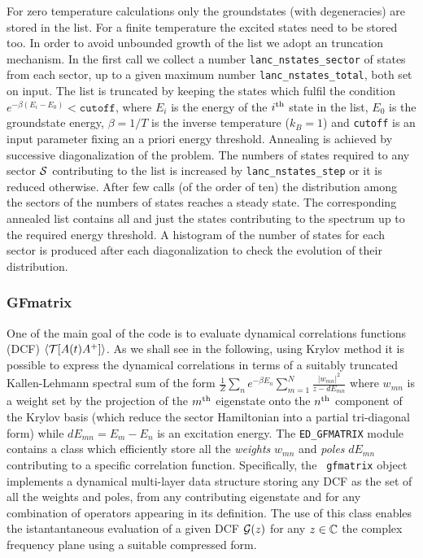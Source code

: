\documentclass[edipack2.tex]{subfiles}
\begin{document}
For zero temperature calculations only the groundstates (with degeneracies) are stored
in the list.
For a finite temperature the excited states need to be stored too.
In order to avoid unbounded growth of the list we adopt an 
truncation mechanism. In the first call we collect a number 
\texttt{lanc\_nstates\_sector} of states from each sector, up to a
given maximum number \texttt{lanc\_nstates\_total}, both set on input.  
The list is truncated by keeping the states which
fulfil the condition $e^{-\beta(E_i-E_0)} < \mathtt{cutoff}$, where
$E_i$ is the energy of the $i^{\rm th}$ state in the list, $E_0$ is the
groundstate energy,  $\beta=1/T$ is the inverse temperature ($k_B=1$) and \texttt{cutoff}
is an input parameter fixing an a priori energy threshold.
%  
Annealing is achieved by successive diagonalization of the problem.
The numbers of states required to any sector ${\cal S}$ contributing to the list is increased by
\texttt{lanc\_nstates\_step} or it is reduced otherwise. After few calls
(of the order of ten) the distribution among the sectors of the
numbers of states reaches a steady state.
The corresponding annealed list contains all and just the states
contributing to the spectrum up to the required energy threshold.
A histogram of the number of states for each sector is produced after
each diagonalization to check the evolution of their distribution.



\subsubsection{GFmatrix}
One of the main goal of the code is to evaluate dynamical correlations
functions (DCF) $\langle {\cal T}[ A(t) A^+ ]\rangle$. As we shall see in the following, using Krylov method it is
possible to express the dynamical correlations in terms of a suitably
truncated Kallen-Lehmann spectral sum of the form
$\tfrac{1}{Z}\sum_n e^{-\beta E_n} \sum_{m=1}^{N} \tfrac{|w_{mn}|^2}{ z
  - dE_{mn}}$ where $w_{mn}$ is a weight set by the 
projection of the $m^{\rm th}$ eigenstate onto the $n^{\rm th}$
component of the Krylov basis (which reduce the sector Hamiltonian
into a partial tri-diagonal form) while $dE_{mn}=E_m-E_n$ is an excitation energy. 
The {\tt ED\_GFMATRIX} module contains a class which efficiently store all
the {\it weights} $w_{mn}$ and {\it poles} $dE_{mn}$ contributing to
a specific correlation function. Specifically, the {\tt
  gfmatrix} object implements a dynamical multi-layer data structure
storing any DCF as the set of all the weights and poles,
from any contributing eigenstate  and for any
combination of operators appearing in its definition.
The use of this class enables the istantantaneous evaluation of a
given  DCF  ${\cal G}(z)$ for any $z\in\mathbb{C}$ the complex frequency plane
using a suitable compressed form. 
  
\end{document}
